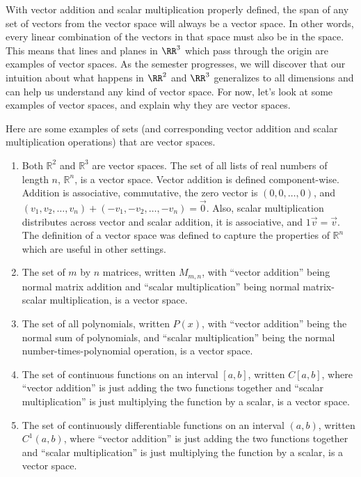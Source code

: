 With vector addition and scalar multiplication properly defined, the span of any set of vectors from the vector space will always be a vector space. In other words, every linear combination of the vectors in that space must also be in the space. This means that lines and planes in $\RR^3$ which pass through the origin are examples of vector spaces. As the semester progresses, we will discover that our intuition about what happens in $\RR^2$ and $\RR^3$ generalizes to all dimensions and can help us understand any kind of vector space.  For now, let's look at some examples of vector spaces, and explain why they are vector spaces.

\begin{example}
Here are some examples of sets (and corresponding vector addition and scalar multiplication operations) that are vector spaces.
\begin{enumerate}
	\item Both ${\mathbb{R}}^2$ and ${\mathbb{R}}^3$ are vector spaces. The set of all lists of real numbers of length $n$, ${\mathbb{R}}^n$, is a vector space.  Vector addition is defined component-wise. Addition is associative, commutative, the zero vector is $(0,0,\ldots,0)$, and $(v_1,v_2,\ldots,v_n)+(-v_1,-v_2,\ldots,-v_n)=\vec 0$. Also, scalar multiplication distributes across vector and scalar addition, it is associative, and $1\vec v=\vec v$.  The definition of a vector space was defined to capture the properties of ${\mathbb{R}}^n$ which are useful in other settings.
	\item The set of $m$ by $n$ matrices, written $M_{m,n}$, with ``vector addition'' being normal matrix addition and ``scalar multiplication'' being normal matrix-scalar multiplication, is a vector space.
	\item The set of all polynomials, written $P(x)$, with ``vector addition'' being the normal sum of polynomials, and ``scalar multiplication'' being the normal number-times-polynomial operation, is a vector space.
	\item The set of continuous functions on an interval $[a,b]$, written $C[a,b]$, where ``vector addition'' is just adding the two functions together and ``scalar multiplication'' is just multiplying the function by a scalar, is a vector space.
	\item The set of continuously differentiable functions on an interval $(a,b)$, written $C^1(a,b)$, where ``vector addition'' is just adding the two functions together and ``scalar multiplication'' is just multiplying the function by a scalar, is a vector space.
\end{enumerate}
\end{example}
